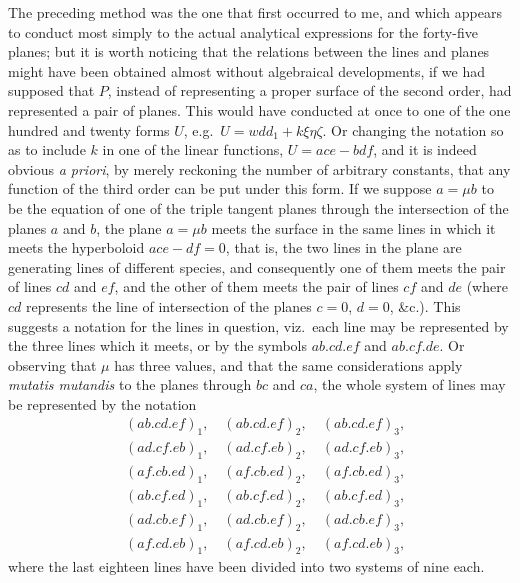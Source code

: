 \documentclass[11pt,a4paper]{article}
\theoremstyle{definition}
\begin{document}
The preceding method was the one that first occurred to me, and which appears to conduct most simply to the actual analytical expressions for the forty-five planes; but it is worth noticing that the relations between the lines and planes might have been obtained almost without algebraical developments, if we had supposed that $P$, instead of representing a proper surface of the second order, had represented a pair of planes. This would have conducted at once to one of the one hundred and twenty forms $U$, e.g.\ $U = wdd_{1} + k\xi\eta\zeta$. Or changing the notation so as to include $k$ in one of the linear functions, $U = ace - bdf$, and it is indeed obvious \textit{a priori}, by merely reckoning the number of arbitrary constants, that any function of the third order can be put under this form. If we suppose $a = \mu b$ to be the equation of one of the triple tangent planes through the intersection of the planes $a$ and $b$, the plane $a = \mu b$ meets the surface in the same lines in which it meets the hyperboloid $ace - df = 0$, that is, the two lines in the plane are generating lines of different species, and consequently one of them meets the pair of lines $cd$ and $ef$, and the other of them meets the pair of lines $cf$ and $de$ (where $cd$ represents the line of intersection of the planes $c = 0$, $d = 0$, \&c.). This suggests a notation for the lines in question, viz.\ each line may be represented by the three lines which it meets, or by the symbols $ab.cd.ef$ and $ab.cf.de$. Or observing that $\mu$ has three values, and that the same considerations apply \textit{mutatis mutandis} to the planes through $bc$ and $ca$, the whole system of lines may be represented by the notation
\begin{align*}
&(ab.cd.ef)_{1}, \quad (ab.cd.ef)_{2}, \quad (ab.cd.ef)_{3}, \\
&(ad.cf.eb)_{1}, \quad (ad.cf.eb)_{2}, \quad (ad.cf.eb)_{3}, \\
&(af.cb.ed)_{1}, \quad (af.cb.ed)_{2}, \quad (af.cb.ed)_{3}, \\
&(ab.cf.ed)_{1}, \quad (ab.cf.ed)_{2}, \quad (ab.cf.ed)_{3}, \\
&(ad.cb.ef)_{1}, \quad (ad.cb.ef)_{2}, \quad (ad.cb.ef)_{3}, \\
&(af.cd.eb)_{1}, \quad (af.cd.eb)_{2}, \quad (af.cd.eb)_{3},
\end{align*}
where the last eighteen lines have been divided into two systems of nine each.

\newpage

\setcounter{page}{452}
\end{document}
